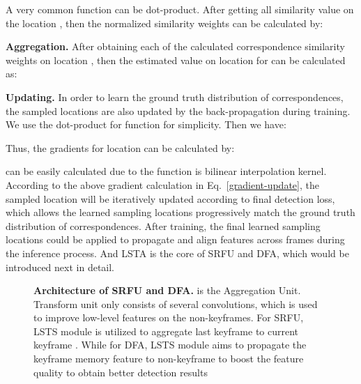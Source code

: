 \documentclass[runningheads]{llncs}
\begin{document}
A very common function  can be dot-product. After getting all similarity value  on the location , then the normalized similarity weights can be calculated by:



\noindent \textbf{Aggregation.}
After obtaining each of the calculated correspondence similarity weights  on location , then the estimated value on location  for  can be calculated as:

\noindent \textbf{Updating.}
In order to learn the ground truth distribution of correspondences, the sampled locations are also updated by the back-propagation during training.
We use the dot-product for function  for simplicity.
Then we have:

Thus, the gradients for location  can be calculated by:

 can be easily calculated due to the function  is bilinear interpolation kernel. 
According to the above gradient calculation in Eq.~\ref{gradient-update}, the sampled location  will be iteratively updated according to final detection loss, which allows the learned sampling locations progressively match the ground truth distribution of correspondences. After training, the final learned sampling locations could be applied to propagate and align features across frames during the inference process. And LSTA is the core of SRFU and DFA, which would be introduced next in detail.

\begin{figure}[t]
\centering
{}\caption{
\textbf{Architecture of SRFU and DFA.} 
 is the Aggregation Unit. 
Transform unit only consists of several convolutions, which is used to improve low-level features on the non-keyframes. 
For SRFU, LSTS module is utilized to aggregate last keyframe  to current keyframe . While for DFA, LSTS module aims to propagate the keyframe memory feature  to non-keyframe  to boost the feature quality to obtain better detection results}
\label{srfu-dfa}
\end{figure}
\end{document}
